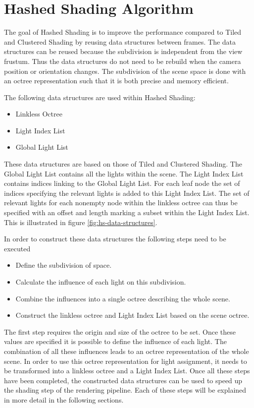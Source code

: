 \section{Hashed Shading Algorithm}



The goal of Hashed Shading is to improve the performance compared to Tiled and
Clustered Shading by reusing data structures between frames. The data structures
can be reused because the subdivision is independent from the view frustum. Thus
the data structures do not need to be rebuild when the camera position or
orientation changes. The subdivision of the scene space is done with an octree
representation such that it is both precise and memory efficient.

The following data structures are used within Hashed Shading:

\begin{itemize}
  \item Linkless Octree
  \item Light Index List
  \item Global Light List
\end{itemize}

\noindent These data structures are based on those of Tiled and Clustered
Shading. The Global Light List contains all the lights within the scene. The
Light Index List contains indices linking to the Global Light List. For each
leaf node the set of indices specifying the relevant lights is added to this
Light Index List. The set of relevant lights for each nonempty node within
the linkless octree can thus be specified with an offset and length marking
a subset within the Light Index List. This is illustrated in
figure \ref{fig:hs-data-structures}.

In order to construct these data structures the following steps need to be
executed

\begin{itemize}
  \item Define the subdivision of space.
  \item Calculate the influence of each light on this subdivision.
  \item Combine the influences into a single octree describing the whole scene.
  \item Construct the linkless octree and Light Index List based on the scene octree. 
\end{itemize}

\noindent The first step requires the origin and size of the octree to be set.
Once these values are specified it is possible to define the influence of each light.
The combination of all these influences leads to an octree representation of the
whole scene. In order to use this octree representation for light assignment, it needs
to be transformed into a linkless octree and a Light Index List. Once all these
steps have been completed, the constructed data structures can be used to speed up
the shading step of the rendering pipeline. Each of these steps will be explained
in more detail in the following sections.

